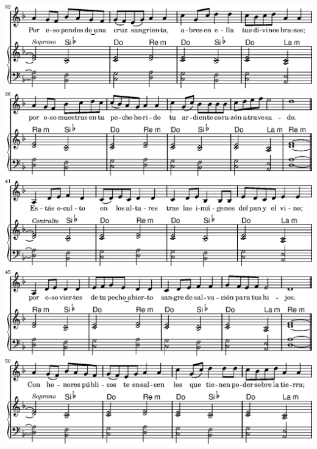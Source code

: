\ifx\betweenLilyPondSystem \undefined
  \linebreak
\else
  \expandafter{}%
\fi
\includegraphics{05/lily-8a2afe59-12}%
\ifx\betweenLilyPondSystem \undefined
  \linebreak
\else
  \expandafter{}%
\fi
\includegraphics{05/lily-8a2afe59-13}%
\ifx\betweenLilyPondSystem \undefined
  \linebreak
\else
  \expandafter{}%
\fi
\includegraphics{05/lily-8a2afe59-14}%
\ifx\betweenLilyPondSystem \undefined
  \linebreak
\else
  \expandafter{}%
\fi
\includegraphics{05/lily-8a2afe59-15}%
\ifx\betweenLilyPondSystem \undefined
  \linebreak
\else
  \expandafter{}%
\fi
\includegraphics{05/lily-8a2afe59-16}%

